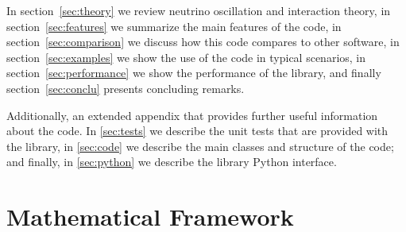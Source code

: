\documentclass[3p,12pt]{elsarticle}
\newcommand{\ttf}{\ttfamily}
\begin{document}
In section~\ref{sec:theory}
we review neutrino oscillation and interaction theory, 
in section~\ref{sec:features} we summarize the main features of the code,
in section~\ref{sec:comparison} we discuss how this code compares to other software,
in section~\ref{sec:examples} we show the use of the code in typical
scenarios, in section~\ref{sec:performance} we show the performance of
the library, and finally section~\ref{sec:conclu} presents concluding remarks.

Additionally, an extended appendix that provides
further useful information about the code.
In \ref{sec:tests} we describe the unit tests that
are provided with the library, in \ref{sec:code} we describe
the main classes and structure of the code; and finally, in \ref{sec:python}
we describe the library {\ttf Python} interface. 

\section{Mathematical Framework}
\end{document}

